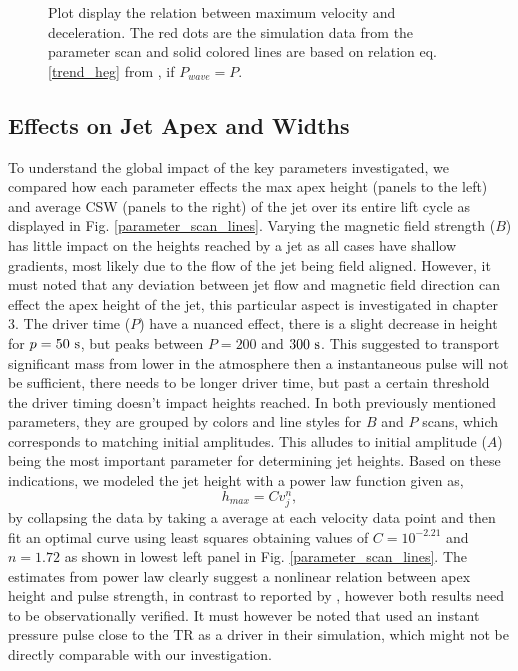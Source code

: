 \documentclass[12pt]{ociamthesis}
\newcommand{\fref}[1]{Fig. \eqref{#1}}
\newcommand{\np}{\\ \\}
\begin{document}
\begin{figure}
\captionsetup[subfigure]{labelformat=empty}
\centering
{} 
\caption{Plot display the relation between maximum velocity and deceleration. The red dots are the simulation data from the parameter scan and solid colored lines are based on relation eq. \eqref{trend_heg} from \cite{Heggland2007ApJ6661277H}, if $P_{wave}=P$.}
\label{decell}
\end{figure}
\subsection{Effects on Jet Apex and Widths}
\label{subsec:jet_apex_widths}
To understand the global impact of the key parameters investigated, we compared how each parameter effects the max apex height (panels to the left) and average CSW (panels to the right) of the jet over its entire lift cycle as displayed in \fref{parameter_scan_lines}. Varying the magnetic field strength ($B$) has little impact on the heights reached by a jet as all cases have shallow gradients, most likely due to the flow of the jet being field aligned. However, it must noted that any deviation between jet flow and magnetic field direction can effect the apex height of the jet, this particular aspect is investigated in chapter 3. The driver time ($P$) have a nuanced effect, there is a slight decrease in height for $p=50~\rm{s}$, but peaks between $P=200$ and $300~\rm{s}$. This suggested to transport significant mass from lower in the atmosphere then a instantaneous pulse will not be sufficient, there needs to be longer driver time, but past a certain threshold the driver timing doesn't impact heights reached. In both previously mentioned parameters, they are grouped by colors and line styles for $B$ and $P$ scans, which corresponds to matching initial amplitudes. This alludes to initial amplitude ($A$) being the most important parameter for determining jet heights. Based on these indications, we modeled the jet height with a power law function given as,   
\begin{equation}
h_{max} = C v_j^{n},
\end{equation} 
by collapsing the data by taking a average at each velocity data point and then fit an optimal curve using least squares obtaining values of $C= 10^{-2.21}$ and $n= 1.72$ as shown in lowest left panel in \fref{parameter_scan_lines}. The estimates from power law clearly suggest a nonlinear relation between apex height and pulse strength, in contrast to reported by \citet{Singh2019}, however both results need to be observationally verified. It must however be noted that \citet{Singh2019} used an instant pressure pulse close to the TR as a driver in their simulation, which might not be directly comparable with our investigation. \np  
\end{document}
